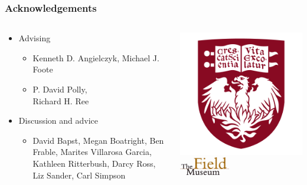 \documentclass{beamer}
\begin{document}
\begin{frame}
  \frametitle{Acknowledgements}
  \begin{columns}
    \begin{column}{0.5\textwidth}
      \begin{itemize}
        \item Advising
          \begin{itemize}
            \item Kenneth D. Angielczyk, Michael J. Foote
            \item P. David Polly, \\Richard H. Ree
          \end{itemize}

        \item Discussion and advice
          \begin{itemize}
            \item David Bapst, Megan Boatright, Ben Frable, Marites Villarosa Garcia, Kathleen Ritterbush, Darcy Ross, Liz Sander, Carl Simpson
          \end{itemize}
      \end{itemize}
    \end{column}
    \begin{column}{0.5\textwidth}
      \includegraphics[height = 0.3\textheight, keepaspectratio = true]{figure/chicago} 
      \includegraphics[width = 0.4\textwidth, keepaspectratio = true]{figure/field}


\end{column}
\end{columns}
\end{frame}
\end{document}
